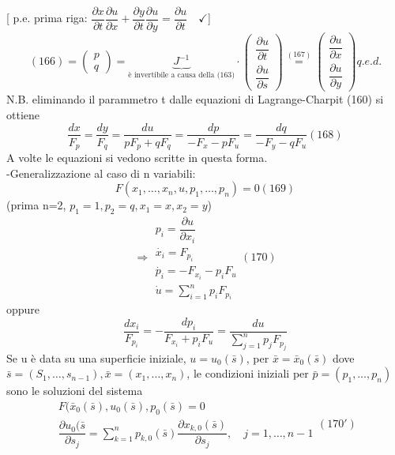 \documentclass[a4paper,11pt]{report}
\newcommand{\x}{\bar{x}}
\begin{document}
[ p.e. prima riga: $\dfrac{\partial x}{\partial t}\dfrac{\partial u}{\partial x} + \dfrac{\partial y}{\partial t}\dfrac{\partial u}{\partial y}=\dfrac{\partial u}{\partial t} \quad \checkmark$]
$$
(166)=\left(\begin{matrix}
p\\
q
\end{matrix}\right) = \underset{\text{è invertibile a causa della (163)}}{\underbrace{J^{-1}}} \cdot \left(\begin{matrix}
\dfrac{\partial u}{\partial t}\\
\dfrac{\partial u}{\partial s}
\end{matrix}\right)\overset{(167)}{=}\left(\begin{matrix}
\dfrac{\partial u}{\partial x} \\
\dfrac{\partial u}{\partial y}
\end{matrix}\right) q.e.d.
$$
N.B. eliminando il parammetro t dalle equazioni di Lagrange-Charpit (160) si ottiene
\begin{equation}
\dfrac{dx}{F_p}=\dfrac{dy}{F_q}=\dfrac{du}{pF_p + qF_q}=\dfrac{dp}{-F_x - pF_u} = \dfrac{dq}{-F_y - qF_u} (168)
\end{equation}
A volte le equazioni si vedono scritte in questa forma.\\
-Generalizzazione al caso di n variabili:
\begin{equation}
F(x_1,\dots,x_n,u,p_1,\dots,p_n)=0 (169)
\end{equation}
(prima n=2, $p_1=1,p_2=q,x_1=x,x_2=y$)
\begin{equation}
\Rightarrow \begin{matrix}
p_i=\dfrac{\partial u}{\partial x_i} \\
\dot{x_i} = F_{p_i} \\
\dot{p_i}=-F_{x_i} - p_i F_u \\
\dot{u}=\sum_{i=1}^n p_i F_{p_i}
\end{matrix} (170)
\end{equation}
oppure 
$$
\dfrac{dx_i}{F_{p_i}}=-\dfrac{dp_i}{F_{x_i} + p_iF_u}=\dfrac{du}{\sum_{j=1}^n p_j F_{p_j}}
$$
Se u è data su una superficie iniziale, $u=u_0(\bar{s})$, per $\x = \x_0(\bar{s})$ dove $\bar{s}=(S_1,\dots,s_{n-1}), \x=(x_1,\dots,x_n)$, le condizioni iniziali per $\bar{p}=(p_1,\dots,p_n)$ sono le soluzioni del sistema
\begin{equation}
\begin{matrix}
F(\x_0(\bar{s}),u_0(\bar{s}),p_0(\bar{s})=0\\
\dfrac{\partial u_0(\bar{s}}{\partial s_j}=\sum_{k=1}^n p_{k,0}(\bar{s})\dfrac{\partial x_{k,0}(\bar{s})}{\partial s_j}, \quad j=1,\dots,n-1
\end{matrix} (170')
\end{equation}
\end{document}
